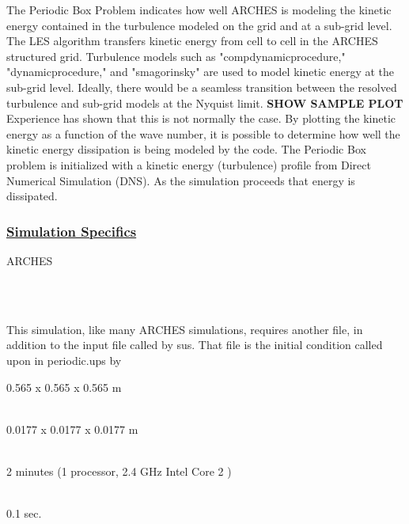 The Periodic Box Problem indicates how well ARCHES is modeling the
kinetic energy contained in the turbulence modeled on the grid and at
a sub-grid level.  The LES algorithm transfers kinetic energy from
cell to cell in the ARCHES structured grid. Turbulence models such as
"compdynamicprocedure," "dynamicprocedure," and "smagorinsky" are used
to model kinetic energy at the sub-grid level.  Ideally, there would
be a seamless transition between the resolved turbulence and sub-grid
models at the Nyquist limit.  {\bf SHOW SAMPLE PLOT}  Experience has shown that this is not normally the case.   By plotting the kinetic energy as a function of the wave number, it is possible to determine how well the kinetic energy dissipation is being modeled by the code.  The Periodic Box problem is initialized with a kinetic energy (turbulence) profile from Direct Numerical Simulation (DNS).  As the simulation proceeds that energy is dissipated.  

\subsubsection*{\underline{Simulation Specifics}}
\begin{description} 
\footnotesize
\item [Component used:] \hfill ARCHES
\item [Input file name:] \hfill {}\\
 
\item [Command used to run input file:]\hfill \\
This simulation, like many ARCHES simulations, requires another file, in addition to the input file called by sus.  That file is the initial condition called upon in periodic.ups by %


\item [Simulation Domain:]\hfill    0.565 x 0.565 x 0.565 m
\item [Cell Spacing:]\hfill \\ 
0.0177 x 0.0177 x 0.0177 m  %

\item [Example Runtimes:] \hfill \\
2 minutes   (1 processor, 2.4 GHz Intel Core 2 )

\item [Physical time simulated:] \hfill \\
0.1 sec.  %
\end{description}

